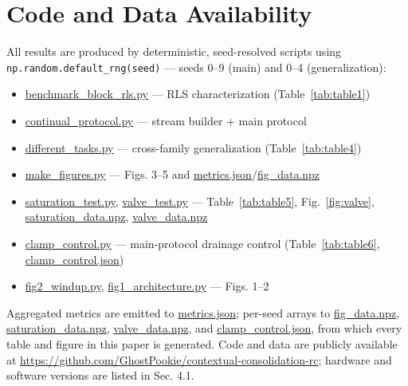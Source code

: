 \documentclass[11pt]{article}
\providecommand{\tightlist}{\setlength{\itemsep}{0pt}%
  \setlength{\parskip}{0pt}}
\begin{document}
\section*{Code and Data Availability}\label{code-and-data-availability}

All results are produced by deterministic, seed-resolved scripts
using \texttt{np.random.default\_rng(seed)} --- seeds 0--9 (main) and 0--4
(generalization):

\begin{itemize}
\tightlist
\item
  \url{benchmark_block_rls.py} --- RLS characterization (Table~\ref{tab:table1})
\item
  \url{continual_protocol.py} --- stream builder + main protocol
\item
  \url{different_tasks.py} --- cross-family generalization (Table~\ref{tab:table4})
\item
  \url{make_figures.py} --- Figs. 3--5 and \url{metrics.json}/\url{fig_data.npz}
\item
  \url{saturation_test.py}, \url{valve_test.py} --- Table~\ref{tab:table5}, Fig.~\ref{fig:valve}, \url{saturation_data.npz}, \url{valve_data.npz}
\item
  \url{clamp_control.py} --- main-protocol drainage control (Table~\ref{tab:table6}, \url{clamp_control.json})
\item
  \url{fig2_windup.py}, \url{fig1_architecture.py} --- Figs. 1--2
\end{itemize}

Aggregated metrics are emitted to \url{metrics.json}; per-seed arrays to
\url{fig_data.npz}, \url{saturation_data.npz}, \url{valve_data.npz}, and
\url{clamp_control.json}, from which every table and figure in this
paper is generated. Code and data are publicly available at
\url{https://github.com/GhostPookie/contextual-consolidation-rc};
hardware and software versions are listed in Sec. 4.1.
\end{document}
